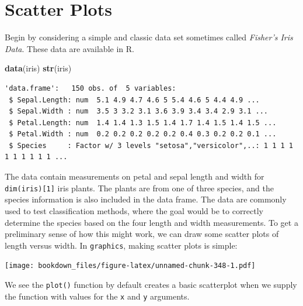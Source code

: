 \documentclass[
]{krantz}
\makeatletter
\newenvironment{Shaded}{\begin{snugshade}}{\end{snugshade}}
\newcommand{\DataTypeTok}[1]{\textcolor[rgb]{0.27,0.27,0.27}{#1}}
\newcommand{\KeywordTok}[1]{\textcolor[rgb]{0.27,0.27,0.27}{\textbf{#1}}}
\newcommand{\NormalTok}[1]{#1}
\newcommand{\OperatorTok}[1]{\textcolor[rgb]{0.43,0.43,0.43}{\textbf{#1}}}
\newenvironment{kframe}{%
\medskip{}
\setlength{\fboxsep}{.8em}
 \def\at@end@of@kframe{}%
 \ifinner\ifhmode%
  \def\at@end@of@kframe{\end{minipage}}%
  \begin{minipage}{\columnwidth}%
 \fi\fi%
 \def\FrameCommand##1{\hskip\@totalleftmargin \hskip-\fboxsep
 \colorbox{shadecolor}{##1}\hskip-\fboxsep
     \hskip-\linewidth \hskip-\@totalleftmargin \hskip\columnwidth}%
 \MakeFramed {\advance\hsize-\width
   \@totalleftmargin\z@ \linewidth\hsize
   \@setminipage}}%
 {\par\unskip\endMakeFramed%
 \at@end@of@kframe}
\renewenvironment{Shaded}{\begin{kframe}}{\end{kframe}}
\makeatother
\begin{document}
\hypertarget{graphics1}{%
\section{Scatter Plots}\label{graphics1}}

Begin by considering a simple and classic data set sometimes called \emph{Fisher's Iris Data}. These data are available in R.

\begin{Shaded}
\begin{Highlighting}[]
\KeywordTok{data}\NormalTok{(iris)}
\KeywordTok{str}\NormalTok{(iris)}
\end{Highlighting}
\end{Shaded}

\begin{verbatim}
'data.frame':	150 obs. of  5 variables:
 $ Sepal.Length: num  5.1 4.9 4.7 4.6 5 5.4 4.6 5 4.4 4.9 ...
 $ Sepal.Width : num  3.5 3 3.2 3.1 3.6 3.9 3.4 3.4 2.9 3.1 ...
 $ Petal.Length: num  1.4 1.4 1.3 1.5 1.4 1.7 1.4 1.5 1.4 1.5 ...
 $ Petal.Width : num  0.2 0.2 0.2 0.2 0.2 0.4 0.3 0.2 0.2 0.1 ...
 $ Species     : Factor w/ 3 levels "setosa","versicolor",..: 1 1 1 1 1 1 1 1 1 1 ...
\end{verbatim}

The data contain measurements on petal and sepal length and width for \texttt{dim(iris){[}1{]}} iris plants. The plants are from one of three species, and the species information is also included in the data frame. The data are commonly used to test classification methods, where the goal would be to correctly determine the species based on the four length and width measurements. To get a preliminary sense of how this might work, we can draw some scatter plots of length versus width. In \texttt{graphics}, making scatter plots is simple:

\begin{Shaded}
\end{Shaded}

\texttt{[image: bookdown\_files/figure-latex/unnamed-chunk-348-1.pdf]}

We see the \texttt{plot()} function by default creates a basic scatterplot when we supply the function with values for the \texttt{x} and \texttt{y} arguments.
\end{document}
